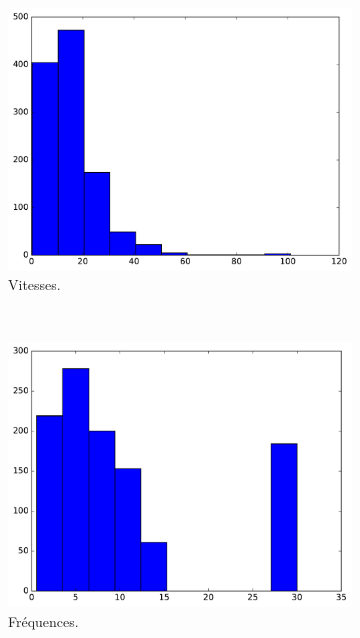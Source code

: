 	\begin{figure}[!htbp]
		\begin{subfigure}[t]{\subImgWclicks}
			\centering
			\includegraphics[width=\textwidth]{figures/ch3/poisson_filteredSpeed}
			\caption{Vitesses.}
			\label{fig:poisson_filteredSpeed}
		\end{subfigure}
		~
		\begin{subfigure}[t]{\subImgWclicks}
			\centering
			\includegraphics[width=\textwidth]{figures/ch3/poisson_frequency}
			\caption{Fréquences.}
			\label{fig:poisson_frequency}
		\end{subfigure}
		~
		\begin{subfigure}[t]{\subImgWclicks}

\end{subfigure}
\end{figure}
